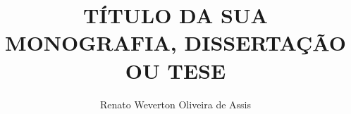 \newcommand{\monog}{%
\uppercase{TÍTULO DA SUA MONOGRAFIA, DISSERTAÇÃO OU TESE}
}
\title{\monog}
\newcommand{\por}{%
Renato Weverton Oliveira de Assis
}
\author{\por}

\newcommand{\subtitulo}{subtítulo deve começar em letra minúscula}

\newcommand{\univ}{\hspace{0.1cm}Pontifícia \hspace{0.1cm}Universidade\hspace{0.1cm} Católica \hspace{0.1cm}de\hspace{0.2cm} Minas\hspace{0.2cm} Gerais}

\newcommand{\curso}{\hspace{0.1cm} Programa \hspace{0.1cm} de \hspace{0.1cm} graduação\hspace{0.1cm} em \hspace{0.1cm} Sistema de Informação}

\newcommand{\grau}{Bacharel em Sistema de Informação}
\newcommand{\tipo}{Monografia }

\newcommand{\profOrientador}{Prof. Paulo César do Amaral Pereira}
\newcommand{\profA}{Prof. Nome do Avaliador}
\newcommand{\profB}{Prof. Nome do Avaliador}

\newcommand{\areaConcentracao}{Inteligência Computacional e Sistemas Distribuídos}

\newcommand{\cidade}{Belo Horizonte}

\newcommand{\ano}{2019}

\newcommand{\dataCompleta}{12 Dezembro de \ano}
